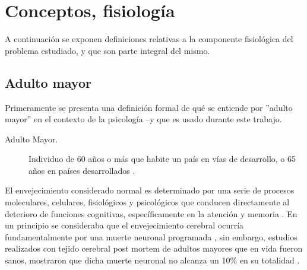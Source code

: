\documentclass[12pt,a4paper]{mitthesis}
\begin{document}

\section{Conceptos, fisiolog\'ia}

A continuaci\'on se exponen definiciones relativas a la componente fisiol\'ogica del problema
estudiado, y que son parte integral del mismo. 

\subsection{Adulto mayor}

Primeramente se presenta una definici\'on formal de qu\'e se entiende por ''adulto mayor'' en el 
contexto de la psicolog\'ia --y que es usado durante este trabajo.

\begin{description}
\item[Adulto Mayor.] Individuo de 60 a\~nos o m\'as que habite un pa\'is en v\'ias de desarrollo, o 
65 a\~nos en pa\'ises desarrollados \cite{Hita14}.
\end{description}

El envejecimiento considerado normal es determinado por una serie de procesos moleculares, 
celulares, fisiol\'ogicos y psicol\'ogicos que conducen directamente al deterioro de funciones 
cognitivas, específicamente en la atenci\'on y memoria \cite{Navarrete03,Park09}. 
En un principio se consideraba que el envejecimiento cerebral ocurr\'ia fundamentalmente por una 
muerte neuronal programada \cite{Coleman87}, sin embargo, estudios realizados con tejido cerebral 
post mortem de adultos mayores que en vida fueron sanos, mostraron que dicha muerte neuronal no 
alcanza un 10\% en su totalidad \cite{Esiri07}. 
\end{document}
